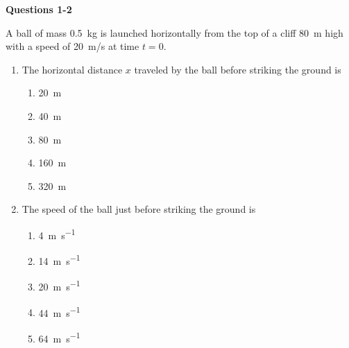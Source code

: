 \documentclass{../../../oss-apphys}
\begin{document}
\genheader


\genmultidirections

\gengravity

\raggedcolumns
\begin{multicols}{2}

  \textbf{Questions 1-2}
  
  A ball of mass \SI{.5}{\kilo\gram} is launched horizontally from the top of a
  cliff \SI{80}{m} high with a speed of \SI{20}{m/s} at time $t=0$.
  \begin{center}
  \end{center}
  \begin{enumerate}[leftmargin=18pt]
  \item The horizontal distance $x$ traveled by the ball before striking the
    ground is
    \begin{enumerate}[noitemsep,topsep=0pt,leftmargin=18pt,label=(\Alph*)]
    \item\SI{20 }{\metre}
    \item\SI{40 }{\metre}
    \item\SI{80 }{\metre} 
    \item\SI{160}{\metre}
    \item\SI{320}{\metre}
    \end{enumerate}

  \item The speed of the ball just before striking the ground is
    \begin{enumerate}[noitemsep,topsep=0pt,leftmargin=18pt,label=(\Alph*)]
    \item\SI{4 }{\metre\per\second}
    \item\SI{14}{\metre\per\second}
    \item\SI{20}{\metre\per\second}
    \item\SI{44}{\metre\per\second}
    \item\SI{64}{\metre\per\second}
    \end{enumerate}


\end{enumerate}
\end{multicols}
\end{document}
